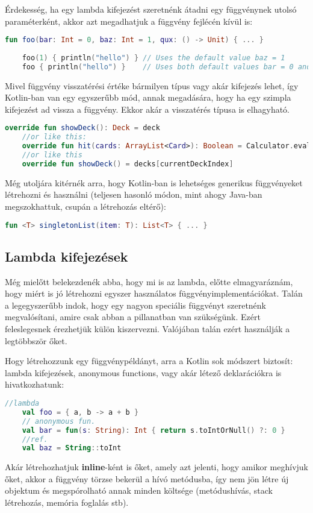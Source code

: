 Érdekesség, ha egy lambda kifejezést szeretnénk átadni egy függvénynek utolsó paraméterként, akkor azt megadhatjuk a függvény fejlécén kívül is:
\scriptsize
\begin{lstlisting}[language = Kotlin]
	fun foo(bar: Int = 0, baz: Int = 1, qux: () -> Unit) { ... }
	
	foo(1) { println("hello") } // Uses the default value baz = 1 
	foo { println("hello") }    // Uses both default values bar = 0 and baz = 1
\end{lstlisting}
\normalsize

Mivel függvény visszatérési értéke bármilyen típus vagy akár kifejezés lehet, így Kotlin-ban van egy egyszerűbb mód, annak megadására, hogy ha egy szimpla kifejezést ad vissza a függvény. Ekkor akár a visszatérés típusa is elhagyható.
\scriptsize
\begin{lstlisting}[language = Kotlin]
	override fun showDeck(): Deck = deck
	//or like this:
	override fun hit(cards: ArrayList<Card>): Boolean = Calculator.evaluate(cards) <= 21
	//or like this
	override fun showDeck() = decks[currentDeckIndex]
\end{lstlisting}
\normalsize
Még utoljára kitérnék arra, hogy Kotlin-ban is lehetséges generikus függvényeket létrehozni és használni (teljesen hasonló módon, mint ahogy Java-ban megszokhattuk, csupán a létrehozás eltérő):
\scriptsize
\begin{lstlisting}[language = Kotlin]
	fun <T> singletonList(item: T): List<T> { ... }
\end{lstlisting}
\normalsize

\subsection{Lambda kifejezések}
\label{subsec:k_lambda}

Még mielőtt belekezdenék abba, hogy mi is az lambda, előtte elmagyaráznám, hogy miért is jó létrehozni egyszer használatos függvényimplementációkat. Talán a legegyszerűbb indok, hogy egy nagyon speciális függvényt szeretnénk megvalósítani, amire csak abban a pillanatban van szükségünk. Ezért feleslegesnek érezhetjük külön kiszervezni. Valójában talán ezért használják a legtöbbször őket.

Hogy létrehozzunk egy függvénypéldányt, arra a Kotlin sok módszert biztosít: lambda kifejezések, anonymous functions, vagy akár létező deklarációkra is hivatkozhatunk:
\scriptsize
\begin{lstlisting}[language = Kotlin]
	//lambda
	val foo = { a, b -> a + b }
	// anonymous fun.
	val bar = fun(s: String): Int { return s.toIntOrNull() ?: 0 }
	//ref.
	val baz = String::toInt
\end{lstlisting}
\normalsize
Akár létrehozhatjuk \textbf{inline}-ként is őket, amely azt jelenti, hogy amikor meghívjuk őket, akkor a függvény törzse bekerül a hívó metódusba, így nem jön létre új objektum és megspórolható annak minden költsége (metódushívás, stack létrehozás, memória foglalás stb).


